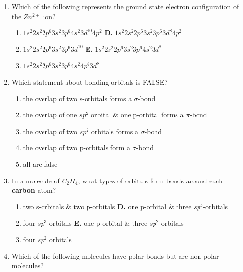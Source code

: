 \documentclass[11pt]{article}
\begin{document}
\begin{enumerate}[leftmargin=*, label=\arabic*.]
    \item Which of the following represents the ground state electron configuration of the $Zn^{2+}$ ion?
    \begin{enumerate}[label=\textbf{\Alph*.}]
        \item $1s^2 2s^2 2p^6 3s^2 3p^6 4s^2 3d^{10} 4p^2$ \hfill \textbf{D.} $1s^2 2s^2 2p^6 3s^2 3p^6 3d^8 4p^2$
        \item $1s^2 2s^2 2p^6 3s^2 3p^6 3d^{10}$ \hfill \textbf{E.} $1s^2 2s^2 2p^6 3s^2 3p^6 4s^2 3d^8$
        \item $1s^2 2s^2 2p^6 3s^2 3p^6 4s^2 4p^6 3d^8$
    \end{enumerate}
    \vspace{1em}

    \item Which statement about bonding orbitals is FALSE?
    \begin{enumerate}[label=\textbf{\Alph*.}]
        \item the overlap of two s-orbitals forms a $\sigma$-bond
        \item the overlap of one $sp^2$ orbital \& one p-orbital forms a $\pi$-bond
        \item the overlap of two $sp^2$ orbitals forms a $\sigma$-bond
        \item the overlap of two p-orbitals form a $\sigma$-bond
        \item all are false
    \end{enumerate}
    \vspace{1em}

    \item In a molecule of $C_2H_4$, what types of orbitals form bonds around each \textbf{carbon} atom?
    \begin{enumerate}[label=\textbf{\Alph*.}]
        \item two s-orbitals \& two p-orbitals \hfill \textbf{D.} one p-orbital \& three $sp^3$-orbitals
        \item four $sp^3$ orbitals \hfill \textbf{E.} one p-orbital \& three $sp^2$-orbitals
        \item four $sp^2$ orbitals
    \end{enumerate}
    \vspace{1em}

    \item Which of the following molecules have polar bonds but are non-polar molecules? \\
    

\end{enumerate}
\end{document}
